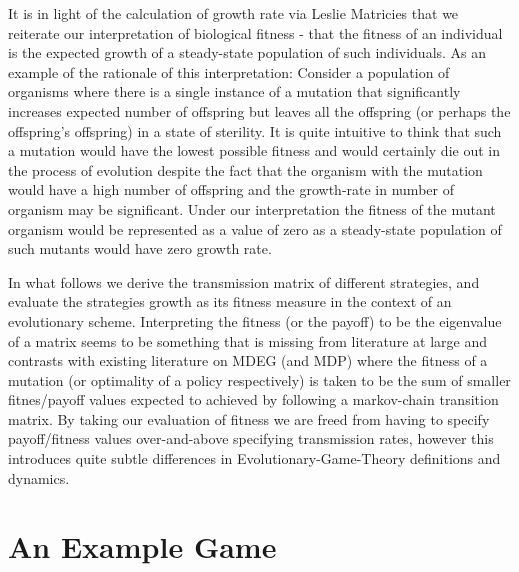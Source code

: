 \documentclass[journal,article,accept,oneauthors,pdftex,10pt,a4paper]{mdpi}
\begin{document}
It is in light of the calculation of growth rate via Leslie Matricies that we reiterate our interpretation of biological fitness - that the fitness of an individual is the expected growth of a steady-state population of such individuals.
As an example of the rationale of this interpretation: Consider a population of organisms where there is a single instance of a mutation that significantly increases expected number of offspring but leaves all the offspring (or perhaps the offspring's offspring) in a state of sterility.
It is quite intuitive to think that such a mutation would have the lowest possible fitness and would certainly die out in the process of evolution despite the fact that the organism with the mutation would have a high number of offspring and the growth-rate in number of organism may be significant. Under our interpretation the fitness of the mutant organism would be represented as a value of zero as a steady-state population of such mutants would have zero growth rate.

In what follows we derive the transmission matrix of different strategies, and evaluate the strategies growth as its fitness measure in the context of an evolutionary scheme.
Interpreting the fitness (or the payoff) to be the eigenvalue of a matrix seems to be something that is missing from literature at large and contrasts with existing literature on MDEG (and MDP) where the fitness of a mutation (or optimality of a policy respectively) is taken to be the sum of smaller fitnes/payoff values expected to achieved by following a markov-chain transition matrix.
By taking our evaluation of fitness we are freed from having to specify payoff/fitness values over-and-above specifying transmission rates, however this introduces quite subtle differences in Evolutionary-Game-Theory definitions and dynamics.

\section{An Example Game}
\end{document}
